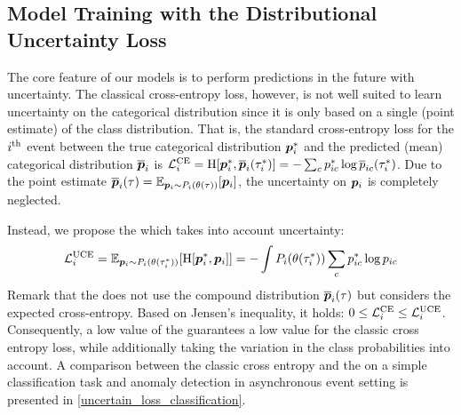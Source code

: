 \subsection{Model Training with the Distributional Uncertainty Loss}
\label{uncertainty_loss}

The core feature of our models is to perform predictions in the future with uncertainty.
The classical cross-entropy loss, however, is not well suited to learn uncertainty on the categorical distribution since it is only based on a single (point estimate) of the class distribution. That is, the standard cross-entropy loss for the $i^{\text{th}}$ event between the true categorical distribution $\bm{p}_{i}^{*}$ and the predicted (mean) categorical distribution $\overline{\bm{p}}_{i}$ is
$\mathcal{L}_{i}^{\text{CE}} = \operatorname{H}[\bm{p}_{i}^*, \overline{\bm{p}}_{i}(\tau_{i}^*)] = - \sum_c p_{i c}^* \log \overline{p}_{i c}(\tau_{i}^*)$. Due to the point estimate $\overline{\bm{p}}_{i}(\tau) = \operatorname{\mathbb{E}}_{\bm{p}_{i} \sim P_{i}(\theta(\tau))}[\bm{p}_{i}]$, the uncertainty on $\bm{p}_{i}$ is completely neglected.


Instead, we propose the \UncertaintyLoss which takes into account uncertainty:
\begin{equation}\label{eq:loss}
\begin{aligned}
\mathcal{L}_{i}^{\text{UCE}} = \operatorname{\mathbb{E}}_{\bm{p}_{i} \sim P_{i}(\theta(\tau_{i}^*))}[\operatorname{H}[\bm{p}_{i}^*, \bm{p}_{i}]] = - \int P_{i}(\theta(\tau_{i}^*)) \sum_c p_{i c}^* \log p_{i c}
\end{aligned}
\end{equation}
Remark that the \UncertaintyLoss does not
use the compound distribution $\overline{\bm{p}}_{i}(\tau)$ but considers the expected cross-entropy. Based on Jensen's inequality, it holds: $0 \leq \mathcal{L}_{i}^{\text{CE}} \leq \mathcal{L}_{i}^{\text{UCE}}
$. Consequently, a low value of the \UncertaintyLoss guarantees a low value for the classic cross entropy loss, while additionally taking the variation in the class probabilities into account. A comparison between the classic cross entropy and the \UncertaintyLoss on a simple classification task and anomaly detection in asynchronous event setting is presented in \cref{uncertain_loss_classification}.

